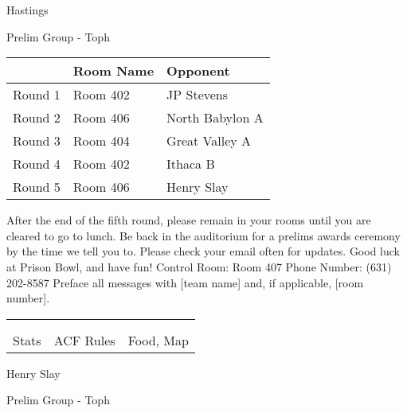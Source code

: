 \documentclass{article}%
\begin{document}
\newpage%
%
\begin{center}%
\begin{Huge}%
Hastings%
\end{Huge}%
\vspace*{12pt}%
\linebreak%
\begin{Large}%
Prelim Group {-} Toph%
\end{Large}%
\end{center}%
\vspace*{4pt}%
\begin{tabularx}{\textwidth}{|c|Y|Y|}%
\hline%
&Room Name&Opponent\\%
\hline%
Round 1&Room 402&JP Stevens\\%
Round 2&Room 406&North Babylon A\\%
Round 3&Room 404&Great Valley A\\%
Round 4&Room 402&Ithaca B\\%
Round 5&Room 406&Henry Slay\\%
\hline%
\end{tabularx}%
\vspace*{30pt}%
\linebreak%
After the end of the fifth round, please remain in your rooms until you are cleared to go to lunch. Be back in the auditorium for a prelims awards ceremony by the time we tell you to. Please check your email often for updates. Good luck at Prison Bowl, and have fun!\newline%
\newline%
Control Room: Room 407\newline%
Phone Number: (631) 202{-}8587\newline%
Preface all messages with {[}team name{]} and, if applicable, {[}room number{]}.%
\vspace*{30pt}%
\newline%
%
\begin{tabularx}{\textwidth}{YYY}%
  &  &  \\%
\\%
Stats&ACF Rules&Food, Map\\%
\end{tabularx}%
\newpage%
%
\begin{center}%
\begin{Huge}%
Henry Slay%
\end{Huge}%
\vspace*{12pt}%
\linebreak%
\begin{Large}%
Prelim Group {-} Toph%
\end{Large}%
\end{center}%
\end{document}
